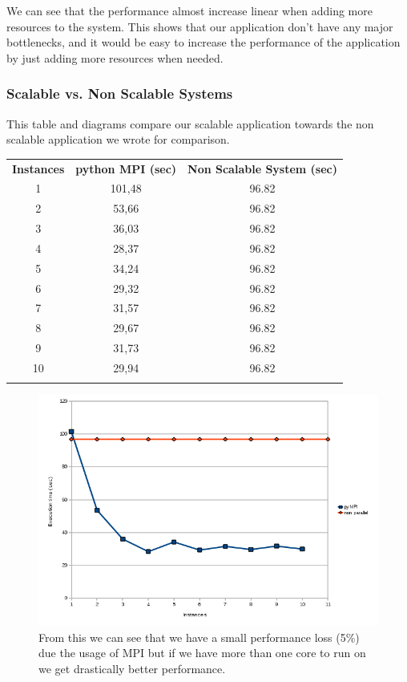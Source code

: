 \documentclass{article}
\begin{document}
We can see that the performance almost increase linear when adding more
resources to the system. This shows that our application don't have any
major bottlenecks, and it would be easy to increase the performance
of the application by just adding more resources when needed.

\subsubsection{Scalable vs. Non Scalable Systems}
This table and diagrams compare our scalable application towards the non
scalable application we wrote for comparison.

\begin{table}[h!]
\begin{tabular}{c c c}
  \rowcolor[gray]{0.5}
  {\bf Instances} & {\bf python MPI (sec)} & {\bf Non Scalable System (sec)} \\
  1 & 101,48 & 96.82 \\
  2 & 53,66  & 96.82  \\
  3 & 36,03  & 96.82  \\
  4 & 28,37  & 96.82  \\
  5 & 34,24  & 96.82  \\
  6 & 29,32  & 96.82  \\
  7 & 31,57  & 96.82  \\
  8 & 29,67  & 96.82  \\
  9 & 31,73  & 96.82  \\
 10 & 29,94  & 96.82  \\
\rowcolor[gray]{0.5}
\end{tabular}
\end{table}
\begin{figure}[h!]
\includegraphics[width=\textwidth]{img/parallel-vs-non-parallel.png}
\center
\caption{From this we can see that we have a small performance loss (5\%) due the usage
of MPI but if we have more than one core to run on we get drastically better
performance.}
\end{figure}
\end{document}
